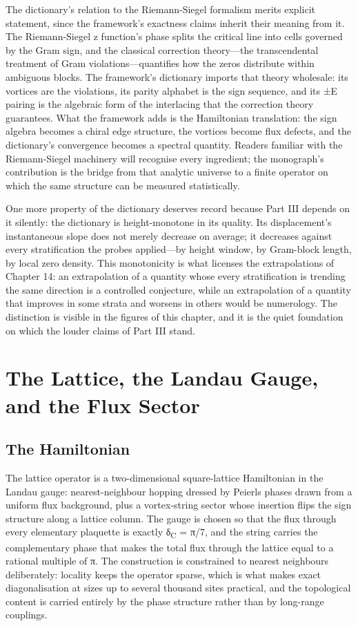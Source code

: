 \documentclass[10pt]{article}
\begin{document}
The dictionary's relation to the Riemann-Siegel formalism merits explicit statement, since the framework's exactness claims inherit their meaning from it. The Riemann-Siegel z function's phase splits the critical line into cells governed by the Gram sign, and the classical correction theory---the transcendental treatment of Gram violations---quantifies how the zeros distribute within ambiguous blocks. The framework's dictionary imports that theory wholesale: its vortices are the violations, its parity alphabet is the sign sequence, and its ±E pairing is the algebraic form of the interlacing that the correction theory guarantees. What the framework adds is the Hamiltonian translation: the sign algebra becomes a chiral edge structure, the vortices become flux defects, and the dictionary's convergence becomes a spectral quantity. Readers familiar with the Riemann-Siegel machinery will recognise every ingredient; the monograph's contribution is the bridge from that analytic universe to a finite operator on which the same structure can be measured statistically.

One more property of the dictionary deserves record because Part III depends on it silently: the dictionary is height-monotone in its quality. Its displacement's instantaneous slope does not merely decrease on average; it decreases against every stratification the probes applied---by height window, by Gram-block length, by local zero density. This monotonicity is what licenses the extrapolations of Chapter 14: an extrapolation of a quantity whose every stratification is trending the same direction is a controlled conjecture, while an extrapolation of a quantity that improves in some strata and worsens in others would be numerology. The distinction is visible in the figures of this chapter, and it is the quiet foundation on which the louder claims of Part III stand.

\section{The Lattice, the Landau Gauge, and the Flux Sector}\label{sec:ch5}
\subsection{The Hamiltonian}\label{sec:51}
The lattice operator is a two-dimensional square-lattice Hamiltonian in the Landau gauge: nearest-neighbour hopping dressed by Peierls phases drawn from a uniform flux background, plus a vortex-string sector whose insertion flips the sign structure along a lattice column. The gauge is chosen so that the flux through every elementary plaquette is exactly δ\textsubscript{C} = π/7, and the string carries the complementary phase that makes the total flux through the lattice equal to a rational multiple of π. The construction is constrained to nearest neighbours deliberately: locality keeps the operator sparse, which is what makes exact diagonalisation at sizes up to several thousand sites practical, and the topological content is carried entirely by the phase structure rather than by long-range couplings.
\end{document}
